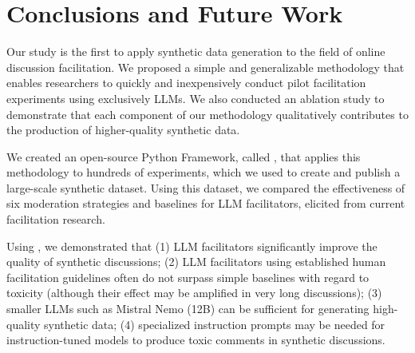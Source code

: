 %
\section{Conclusions and Future Work}

Our study is the first to apply synthetic data generation to the field of online discussion facilitation. We proposed a simple and generalizable methodology that enables researchers to quickly and inexpensively conduct pilot facilitation experiments using exclusively \acp{LLM}. We also conducted an ablation study to demonstrate that each component of our methodology qualitatively contributes to the production of higher-quality synthetic data.

We created an open-source Python Framework, called \syndisco, that applies this methodology to hundreds of experiments, which we used to create and publish \vmd a large-scale synthetic dataset. Using this dataset, we compared the effectiveness of six moderation strategies and baselines for \ac{LLM} facilitators, elicited from current facilitation research. 

Using \syndisco, we demonstrated that (1) \ac{LLM} facilitators significantly improve the quality of synthetic discussions; (2) \ac{LLM} facilitators using established human facilitation guidelines often do not surpass simple baselines with regard to toxicity (although their effect may be amplified in very long discussions); (3) smaller \acp{LLM} such as Mistral Nemo (12B) can be sufficient for generating high-quality synthetic data; (4) specialized instruction prompts may be needed for instruction-tuned models to produce toxic comments in synthetic discussions. 